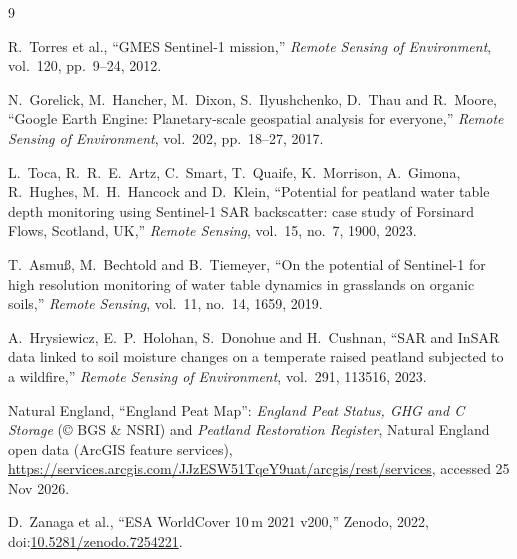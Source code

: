 \documentclass[10pt,a4paper,twocolumn]{article}
\begin{document}
\begingroup
\footnotesize
\renewcommand{\section}[2]{\subsection*{References}}
\begin{thebibliography}{9}
  \setlength{\itemsep}{0pt}

  R.~Torres et al., ``GMES Sentinel-1 mission,''
  \emph{Remote Sensing of Environment}, vol.~120, pp.~9--24, 2012.

  N.~Gorelick, M.~Hancher, M.~Dixon, S.~Ilyushchenko, D.~Thau and R.~Moore,
  ``Google Earth Engine: Planetary-scale geospatial analysis for everyone,''
  \emph{Remote Sensing of Environment}, vol.~202, pp.~18--27, 2017.

  L.~Toca, R.~R.~E.~Artz, C.~Smart, T.~Quaife, K.~Morrison, A.~Gimona,
  R.~Hughes, M.~H.~Hancock and D.~Klein, ``Potential for peatland water table
  depth monitoring using Sentinel-1 SAR backscatter: case study of Forsinard
  Flows, Scotland, UK,'' \emph{Remote Sensing}, vol.~15, no.~7, 1900, 2023.

  T.~Asmu{\ss}, M.~Bechtold and B.~Tiemeyer, ``On the potential of Sentinel-1
  for high resolution monitoring of water table dynamics in grasslands on
  organic soils,'' \emph{Remote Sensing}, vol.~11, no.~14, 1659, 2019.

  A.~Hrysiewicz, E.~P.~Holohan, S.~Donohue and H.~Cushnan, ``SAR and InSAR data
  linked to soil moisture changes on a temperate raised peatland subjected to a
  wildfire,'' \emph{Remote Sensing of Environment}, vol.~291, 113516, 2023.


  Natural England, ``England Peat Map'': \emph{England Peat Status, GHG and C
  Storage} (\copyright{} BGS \& NSRI) and \emph{Peatland Restoration Register},
  Natural England open data (ArcGIS feature services),
  \url{https://services.arcgis.com/JJzESW51TqeY9uat/arcgis/rest/services},
  accessed 25 Nov 2026.

  D.~Zanaga et al., ``ESA WorldCover 10\,m 2021 v200,'' Zenodo, 2022,
  doi:\href{https://doi.org/10.5281/zenodo.7254221}{10.5281/zenodo.7254221}.


\end{thebibliography}
\end{document}
